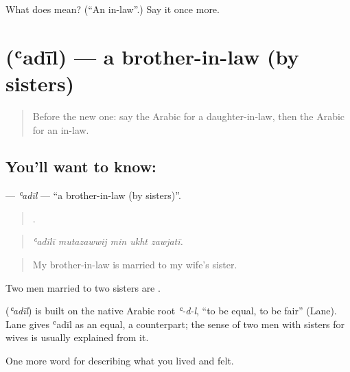 \begin{tcolorbox}[breakable,colback=teal!4,colframe=teal!35!black,title={Before you move on}]
What does  mean? (\textquotedblleft{}An in-law\textquotedblright{}.) Say it once more.
\end{tcolorbox}
\section[\texorpdfstring{\ar{عديل} (ʿadīl)}{عديل (ʿadīl)}]{ (ʿadīl) — a brother-in-law (by sisters)}

\label{lesson:AR-C529-adil}



\begin{quote}
Before the new one: say the Arabic for a daughter-in-law, then the Arabic for an in-law.
\end{quote}

\subsection*{You'll want to know: }
\textbf{} — \emph{ʿadīl} — \textquotedblleft{}a brother-in-law (by sisters)\textquotedblright{}.

\begin{quote}
    .
\end{quote}

\begin{quote}
\emph{ʿadīlī mutazawwij min ukht zawjatī.}
\end{quote}

\begin{quote}
My brother-in-law is married to my wife's sister.
\end{quote}

Two men married to two sisters are .

\begin{cousinweb}
\textbf{} (\emph{ʿadīl}) is built on the native Arabic root \emph{ʿ-d-l}, \textquotedblleft{}to be equal, to be fair\textquotedblright{} (Lane). Lane gives ʿadīl as an equal, a counterpart; the sense of two men with sisters for wives is usually explained from it.
\end{cousinweb}

\begin{grammarlens}[title={What you've built}]
One more word for describing what you lived and felt.
\end{grammarlens}


